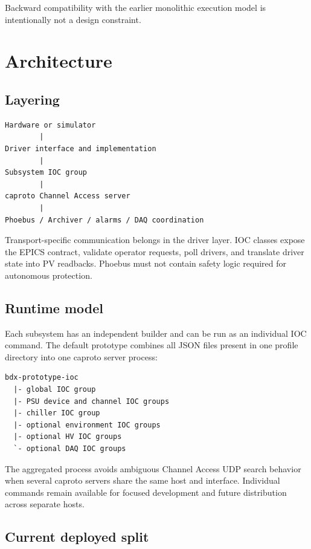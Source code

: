 Backward compatibility with the earlier monolithic  execution model is intentionally not a design constraint.

\section{Architecture}

\subsection{Layering}

\begin{lstlisting}
Hardware or simulator
        |
Driver interface and implementation
        |
Subsystem IOC group
        |
caproto Channel Access server
        |
Phoebus / Archiver / alarms / DAQ coordination
\end{lstlisting}

Transport-specific communication belongs in the driver layer. IOC classes expose the EPICS contract, validate operator requests, poll drivers, and translate driver state into PV readbacks. Phoebus must not contain safety logic required for autonomous protection.

\subsection{Runtime model}

Each subsystem has an independent builder and can be run as an individual IOC command. The default prototype combines all JSON files present in one profile directory into one caproto server process:

\begin{lstlisting}
bdx-prototype-ioc
  |- global IOC group
  |- PSU device and channel IOC groups
  |- chiller IOC group
  |- optional environment IOC groups
  |- optional HV IOC groups
  `- optional DAQ IOC groups
\end{lstlisting}

The aggregated process avoids ambiguous Channel Access UDP search behavior when several caproto servers share the same host and interface. Individual commands remain available for focused development and future distribution across separate hosts.

\subsection{Current deployed split}

